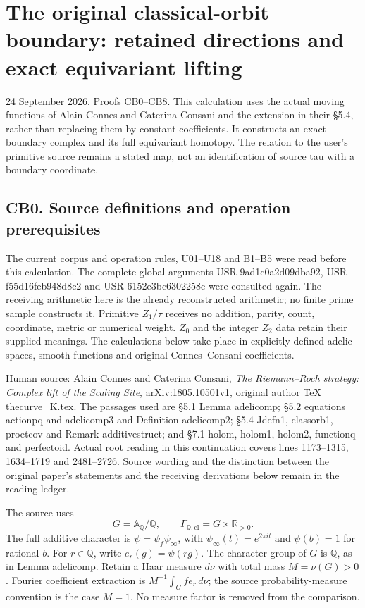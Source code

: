 \section{The original classical-orbit boundary: retained directions and
exact equivariant
lifting}\label{the-original-classical-orbit-boundary-retained-directions-and-exact-equivariant-lifting}

24 September 2026. Proofs CB0--CB8. This calculation uses the actual
moving functions of Alain Connes and Caterina Consani and the extension
in their §5.4, rather than replacing them by constant coefficients. It
constructs an exact boundary complex and its full equivariant homotopy.
The relation to the user's primitive source remains a stated map, not an
identification of source tau with a boundary coordinate.

\subsection{CB0. Source definitions and operation
prerequisites}\label{cb0.-source-definitions-and-operation-prerequisites}

The current corpus and operation rules, U01--U18 and B1--B5 were read
before this calculation. The complete global arguments
USR-9ad1c0a2d09dba92, USR-f55d16feb948d8c2 and USR-6152e3bc6302258c were
consulted again. The receiving arithmetic here is the already
reconstructed arithmetic; no finite prime sample constructs it.
Primitive \(Z_1/\tau\) receives no addition, parity, count, coordinate,
metric or numerical weight. \(Z_0\) and the integer \(Z_2\) data retain
their supplied meanings. The calculations below take place in explicitly
defined adelic spaces, smooth functions and original Connes--Consani
coefficients.

Human source: Alain Connes and Caterina Consani,
\href{https://arxiv.org/abs/1805.10501v1}{\emph{The Riemann--Roch
strategy: Complex lift of the Scaling Site}, arXiv:1805.10501v1},
original author TeX thecurve\_K.tex. The passages used are §5.1 Lemma
adelicomp; §5.2 equations actionpq and adelicomp3 and Definition
adelicomp2; §5.4 Jdefn1, classorb1, proetcov and Remark additivestruct;
and §7.1 holom, holom1, holom2, functionq and perfectoid. Actual root
reading in this continuation covers lines 1173--1315, 1634--1719 and
2481--2726. Source wording and the distinction between the original
paper's statements and the receiving derivations below remain in the
reading ledger.

The source uses \[
G=\mathbb A_{\mathbb Q}/\mathbb Q,\qquad
\Gamma_{\mathbb Q,\mathrm{cl}}=G\times\mathbb R_{>0}.
\] The full additive character is \(\psi=\psi_f\psi_\infty\), with
\(\psi_\infty(t)=e^{2\pi it}\) and \(\psi(b)=1\) for rational \(b\). For
\(r\in\mathbb Q\), write \(e_r(g)=\psi(rg)\). The character group of
\(G\) is \(\mathbb Q\), as in Lemma adelicomp. Retain a Haar measure
\(d\nu\) with total mass \(M=\nu(G)>0\). Fourier coefficient extraction
is \(M^{-1}\int_G f\overline{e_r}\,d\nu\); the source
probability-measure convention is the case \(M=1\). No measure factor is
removed from the comparison.

